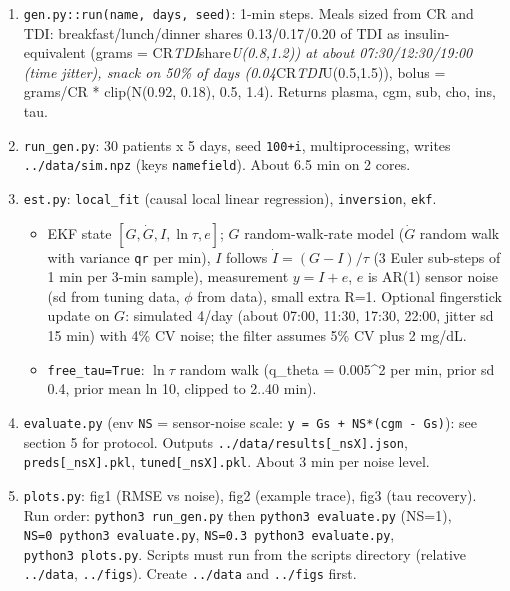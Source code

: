 \documentclass[11pt,a4paper]{article}
\providecommand{\tightlist}{\setlength{\itemsep}{0pt}\setlength{\parskip}{0pt}}
\begin{document}
\begin{enumerate}
\def\labelenumi{\arabic{enumi}.}
\tightlist
\item
  \texttt{gen.py::run(name,\ days,\ seed)}: 1-min steps. Meals sized
  from CR and TDI: breakfast/lunch/dinner shares 0.13/0.17/0.20 of TDI
  as insulin-equivalent (grams = CR\emph{TDI}share\emph{U(0.8,1.2)) at
  about 07:30/12:30/19:00 (time jitter), snack on 50\% of days
  (0.04}CR\emph{TDI}U(0.5,1.5)), bolus = grams/CR * clip(N(0.92, 0.18),
  0.5, 1.4). Returns plasma, cgm, sub, cho, ins, tau.
\item
  \texttt{run\_gen.py}: 30 patients x 5 days, seed \texttt{100+i},
  multiprocessing, writes \texttt{../data/sim.npz} (keys
  \texttt{name\textbar{}field}). About 6.5 min on 2 cores.
\item
  \texttt{est.py}: \texttt{local\_fit} (causal local linear regression),
  \texttt{inversion}, \texttt{ekf}.

  \begin{itemize}
  \tightlist
  \item
    EKF state \([G, \dot G, I, \ln\tau, e]\); \(G\) random-walk-rate
    model (\(\dot G\) random walk with variance \texttt{qr} per min),
    \(I\) follows \(\dot I = (G-I)/\tau\) (3 Euler sub-steps of 1 min
    per 3-min sample), measurement \(y = I + e\), \(e\) is AR(1) sensor
    noise (sd from tuning data, \(\phi\) from data), small extra R=1.
    Optional fingerstick update on \(G\): simulated 4/day (about 07:00,
    11:30, 17:30, 22:00, jitter sd 15 min) with 4\% CV noise; the filter
    assumes 5\% CV plus 2 mg/dL.
  \item
    \texttt{free\_tau=True}: \(\ln\tau\) random walk (q\_theta =
    0.005\^{}2 per min, prior sd 0.4, prior mean ln 10, clipped to 2..40
    min).
  \end{itemize}
\item
  \texttt{evaluate.py} (env \texttt{NS} = sensor-noise scale:
  \texttt{y\ =\ Gs\ +\ NS*(cgm\ -\ Gs)}): see section 5 for protocol.
  Outputs \texttt{../data/results{[}\_nsX{]}.json},
  \texttt{preds{[}\_nsX{]}.pkl}, \texttt{tuned{[}\_nsX{]}.pkl}. About 3
  min per noise level.
\item
  \texttt{plots.py}: fig1 (RMSE vs noise), fig2 (example trace), fig3
  (tau recovery). Run order: \texttt{python3\ run\_gen.py} then
  \texttt{python3\ evaluate.py} (NS=1),
  \texttt{NS=0\ python3\ evaluate.py},
  \texttt{NS=0.3\ python3\ evaluate.py}, \texttt{python3\ plots.py}.
  Scripts must run from the scripts directory (relative
  \texttt{../data}, \texttt{../figs}). Create \texttt{../data} and
  \texttt{../figs} first.
\end{enumerate}
\end{document}
